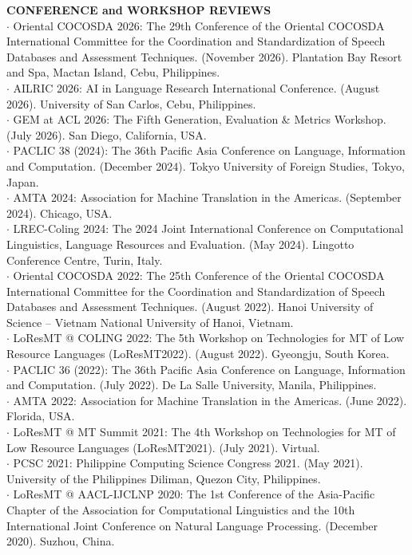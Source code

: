 \documentclass[margin]{res}
\begin{document}
\begin{resume}
\textbf{CONFERENCE and WORKSHOP REVIEWS}\\
$\cdot$ Oriental COCOSDA 2026: The 29th Conference of the Oriental COCOSDA International Committee for the Coordination and Standardization of Speech Databases and Assessment Techniques. (November 2026). Plantation Bay Resort and Spa, Mactan Island, Cebu, Philippines.\\
$\cdot$ AILRIC 2026: AI in Language Research International Conference. (August 2026). University of San Carlos, Cebu, Philippines.\\
$\cdot$ GEM at ACL 2026: The Fifth Generation, Evaluation \& Metrics Workshop. (July 2026). San Diego, California, USA.\\
$\cdot$ PACLIC 38 (2024): The 36th Pacific Asia Conference on Language, Information and Computation. (December 2024). Tokyo University of Foreign Studies, Tokyo, Japan.\\
$\cdot$ AMTA 2024: Association for Machine Translation in the Americas. (September 2024). Chicago, USA.\\
$\cdot$ LREC-Coling 2024: The 2024 Joint International Conference on Computational Linguistics, Language Resources and Evaluation. (May 2024). Lingotto Conference Centre, Turin, Italy.\\
$\cdot$ Oriental COCOSDA 2022: The 25th Conference of the Oriental COCOSDA International Committee for the Coordination and Standardization of Speech Databases and Assessment Techniques. (August 2022). Hanoi University of Science – Vietnam National University of Hanoi, Vietnam.\\
$\cdot$ LoResMT @ COLING 2022: The 5th Workshop on Technologies for MT of Low Resource Languages (LoResMT2022). (August 2022). Gyeongju, South Korea.\\
$\cdot$ PACLIC 36 (2022): The 36th Pacific Asia Conference on Language, Information and Computation. (July 2022). De La Salle University, Manila, Philippines.\\
$\cdot$ AMTA 2022: Association for Machine Translation in the Americas. (June 2022). Florida, USA.\\
$\cdot$ LoResMT @ MT Summit 2021: The 4th Workshop on Technologies for MT of Low Resource Languages (LoResMT2021). (July 2021). Virtual.\\
$\cdot$ PCSC 2021: Philippine Computing Science Congress 2021. (May 2021). University of the Philippines Diliman, Quezon City, Philippines.\\
$\cdot$ LoResMT @ AACL-IJCLNP 2020: The 1st Conference of the Asia-Pacific Chapter of the Association for Computational Linguistics and the 10th International Joint Conference on Natural Language Processing. (December 2020). Suzhou, China.\\

\end{resume}
\end{document}
